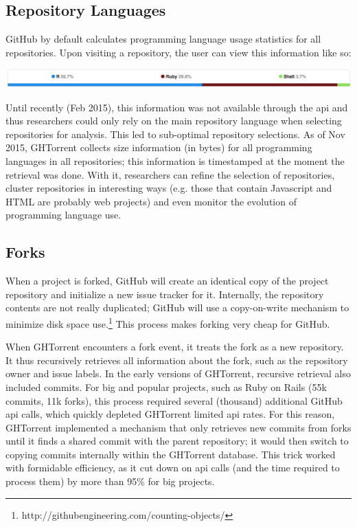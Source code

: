 \documentclass{sig-alternate}
\begin{document}
\subsection{Repository Languages}
GitHub by default calculates programming language usage statistics for all
repositories. Upon visiting a repository, the user can view this information
like so:

\noindent\includegraphics[scale=0.243]{languages}

Until recently (Feb 2015), this information was not available through the {\sc api}
and thus researchers could only rely on the main repository language when
selecting repositories for analysis. This led to sub-optimal repository
selections. As of Nov 2015, GHTorrent collects size information (in
bytes) for all programming languages in all repositories; this information is
timestamped at the moment the retrieval was done. With it, researchers can
refine the selection of repositories, cluster repositories in interesting ways
(e.g. those that contain Javascript and HTML are probably web projects) and even
monitor the evolution of programming language use.

\subsection{Forks}

When a project is forked, GitHub will create an identical copy of the project
repository and initialize a new issue tracker for it. Internally, the repository
contents are not really duplicated; GitHub will use a copy-on-write mechanism to
minimize disk space
use.\footnote{http://githubengineering.com/counting-objects/} This process makes
forking very cheap for GitHub.

When GHTorrent encounters a fork event, it treats the fork as a new repository.
It thus recursively retrieves all information about the fork, such as the
repository owner and issue labels. In the early versions of GHTorrent, recursive
retrieval also included commits. For big and popular projects, such as Ruby on
Rails (55k commits, 11k forks), this process required several (thousand)
additional GitHub {\sc api} calls, which quickly depleted GHTorrent limited {\sc
api} rates. For this reason, GHTorrent implemented a mechanism that only
retrieves new commits from forks until it finds a shared commit with the parent
repository; it would then switch to copying commits internally within the
GHTorrent database. This trick worked with formidable efficiency, as it cut down
on {\sc api} calls (and the time required to process them) by more than 95\% for
big projects.
\end{document}
